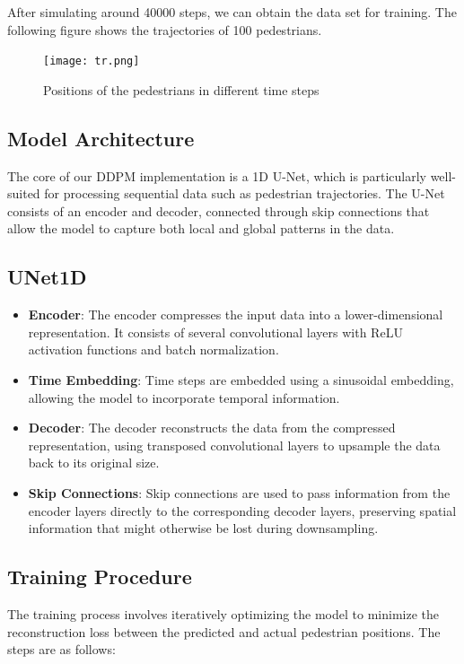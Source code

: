 \documentclass[10pt,a4paper]{article}
\begin{document}
After simulating around 40000 steps, we can obtain the data set for training. The following figure shows the trajectories of 100 pedestrians.
\begin{figure}[h!]
    \centering
    \texttt{[image: tr.png]}
    \caption{Positions of the pedestrians in different time steps}
    \label{fig:3}
\end{figure}

\newpage
\subsection{Model Architecture}
The core of our DDPM implementation is a 1D U-Net, which is particularly well-suited for processing sequential data such as pedestrian trajectories. The U-Net consists of an encoder and decoder, connected through skip connections that allow the model to capture both local and global patterns in the data.

\subsection*{UNet1D}

\begin{itemize}
    \item \textbf{Encoder}: The encoder compresses the input data into a lower-dimensional representation. It consists of several convolutional layers with ReLU activation functions and batch normalization.
    \item \textbf{Time Embedding}: Time steps are embedded using a sinusoidal embedding, allowing the model to incorporate temporal information.
    \item \textbf{Decoder}: The decoder reconstructs the data from the compressed representation, using transposed convolutional layers to upsample the data back to its original size.
    \item \textbf{Skip Connections}: Skip connections are used to pass information from the encoder layers directly to the corresponding decoder layers, preserving spatial information that might otherwise be lost during downsampling.
\end{itemize}

\subsection{Training Procedure}

The training process involves iteratively optimizing the model to minimize the reconstruction loss between the predicted and actual pedestrian positions. The steps are as follows:
\end{document}
